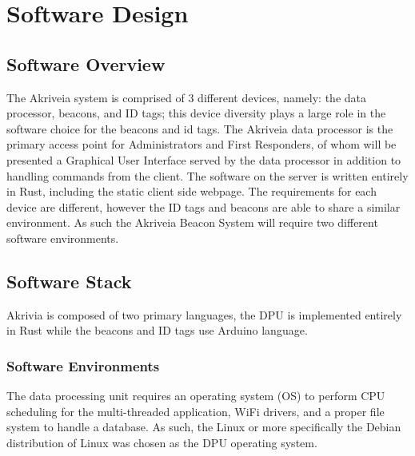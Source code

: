 

\setcounter{section}{5}
\section{Software Design}
\bigskip



\subsection{Software Overview}
\medskip
The Akriveia system is comprised of 3 different devices, namely: the data processor, beacons, and ID tags; this device diversity plays a large role in the software choice for the beacons and id tags. The Akriveia data processor is the primary access point for Administrators and First Responders, of whom will be presented a Graphical User Interface served by the data processor in addition to handling commands from the client. The software on the server is written entirely in Rust, including the static client side webpage. The requirements for each device are different, however the ID tags and beacons are able to share a similar environment.
As such the Akriveia Beacon System will require two different software environments.

\medskip
\subsection{Software Stack}
\medskip
Akrivia is composed of two primary languages, the DPU is implemented entirely in Rust while the beacons and ID tags use Arduino language.

\medskip
\subsubsection{Software Environments}
\medskip
The data processing unit requires an operating system (\Gls{OS}) to perform CPU scheduling for the multi-threaded application, WiFi drivers, and a proper file system to handle a database. As such, the Linux or more specifically the \Gls{Debian} distribution of Linux was chosen as the DPU operating system.

